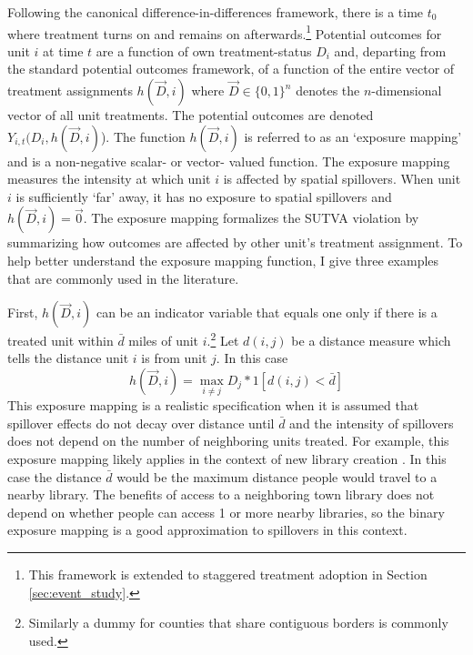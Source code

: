 \documentclass[11pt]{article}
\begin{document}
Following the canonical difference-in-differences framework, there is a time $t_0$ where treatment turns on and remains on afterwards.\footnote{This framework is extended to staggered treatment adoption in Section \ref{sec:event_study}.} Potential outcomes for unit $i$ at time $t$ are a function of own treatment-status $D_i$ and, departing from the standard potential outcomes framework, of a function of the entire vector of treatment assignments $h(\vec{D}, i)$ where $\vec{D} \in \{0,1 \}^n$ denotes the $n$-dimensional vector of all unit treatments. The potential outcomes are denoted $Y_{i,t}(D_i, h(\vec{D}, i)$). The function $h(\vec{D}, i)$ is referred to as an `exposure mapping' and is a non-negative scalar- or vector- valued function. The exposure mapping measures the intensity at which unit $i$ is affected by spatial spillovers. When unit $i$ is sufficiently `far' away, it has no exposure to spatial spillovers and $h(\vec{D}, i) = \vec{0}$. The exposure mapping formalizes the SUTVA violation by summarizing how outcomes are affected by other unit's treatment assignment. To help better understand the exposure mapping function, I give three examples that are commonly used in the literature.

\begin{example}
    First, $h(\vec{D}, i)$ can be an indicator variable that equals one only if there is a treated unit within $\bar{d}$ miles of unit $i$.\footnote{Similarly a dummy for counties that share contiguous borders is commonly used.} Let $d(i,j)$ be a distance measure which tells the distance unit $i$ is from unit $j$.  In this case \begin{equation}\label{eq:h_within}
        h(\vec{D}, i) = \max_{i \neq j} D_j * 1[ d(i,j) < \bar{d} ] 
    \end{equation}
    This exposure mapping is a realistic specification when it is assumed that spillover effects do not decay over distance until $\bar{d}$ and the intensity of spillovers does not depend on the number of neighboring units treated. For example, this exposure mapping likely applies in the context of new library creation \citep{Berkes_Nencka_2020}. In this case the distance $\bar{d}$ would be the maximum distance people would travel to a nearby library. The benefits of access to a neighboring town library does not depend on whether people can access 1 or more nearby libraries, so the binary exposure mapping is a good approximation to spillovers in this context.  
\end{example}
    
\end{document}
